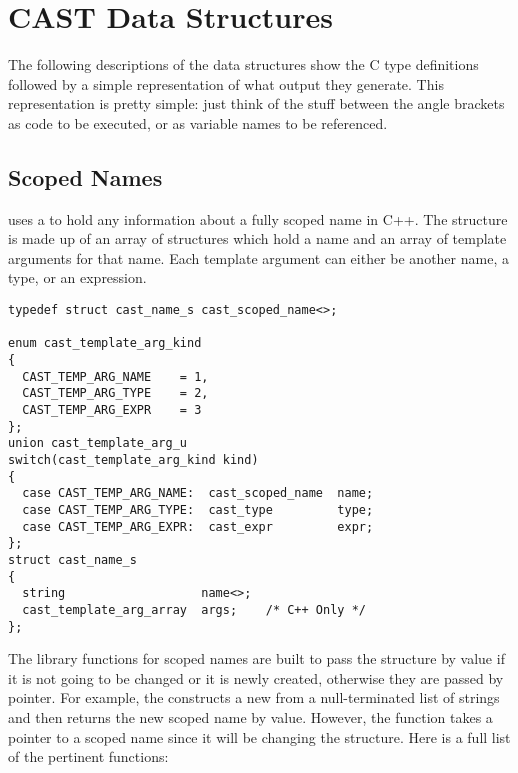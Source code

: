 

\section{CAST Data Structures}
\label{sec:CAST:CAST Data Structures}

The following descriptions of the data structures show the C type definitions
followed by a simple representation of what output they generate.  This
representation is pretty simple: just think of the stuff between the angle
brackets as code to be executed, or as variable names to be referenced.



\subsection{Scoped Names}
\label{subsec:CAST:Scoped Names}

\CAST{} uses a  to hold any information about a fully
scoped name in C++.  The structure is made up of an array of
 structures which hold a name and an array of template
arguments for that name.  Each template argument can either be another name, a
type, or an expression.

\begin{verbatim}
typedef struct cast_name_s cast_scoped_name<>;

enum cast_template_arg_kind
{
  CAST_TEMP_ARG_NAME    = 1,
  CAST_TEMP_ARG_TYPE    = 2,
  CAST_TEMP_ARG_EXPR    = 3
};
union cast_template_arg_u
switch(cast_template_arg_kind kind)
{
  case CAST_TEMP_ARG_NAME:  cast_scoped_name  name;
  case CAST_TEMP_ARG_TYPE:  cast_type         type;
  case CAST_TEMP_ARG_EXPR:  cast_expr         expr;
};
struct cast_name_s
{
  string                   name<>;
  cast_template_arg_array  args;    /* C++ Only */
};
\end{verbatim}

The \CAST{} library functions for scoped names are built to pass the
 structure by value if it is not going to be changed or
it is newly created, otherwise they are passed by pointer.  For example, the
 constructs a new  from
a null-terminated  list of strings and then returns the
new scoped name by value.  However, the 
function takes a pointer to a scoped name since it will be changing the
structure.  Here is a full list of the pertinent  functions:


